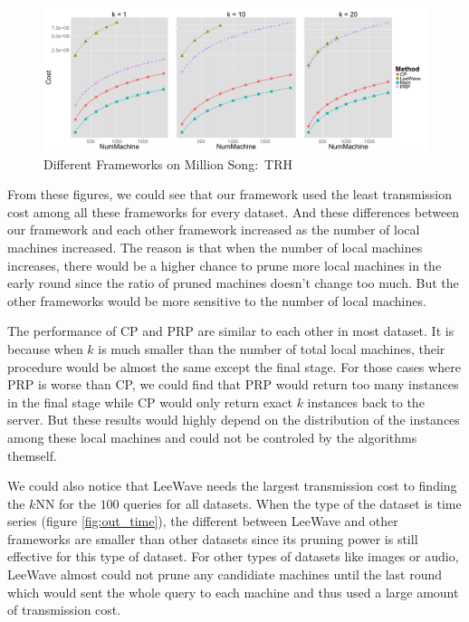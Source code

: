 \begin{figure}[htpb!]
  \centering
  \includegraphics[width=1.0\linewidth]{exp/out/trh.png}
  \caption{Different Frameworks on Million Song:~TRH}
  \label{fig:out_trh}
\end{figure}

From these figures, we could see that our framework used the least transmission cost among all these frameworks for every dataset.  And these differences between our framework and each other framework increased as the number of local machines increased.  The reason is that when the number of local machines increases, there would be a higher chance to prune more local machines in the early round since the ratio of pruned machines doesn't change too much.  But the other frameworks would be more sensitive to the number of local machines.


The performance of CP and PRP are similar to each other in most dataset.  It is because when $k$ is much smaller than the number of total local machines, their procedure would be almost the same except the final stage.  For those cases where PRP is worse than CP, we could find that PRP would return too many instances in the final stage while CP would only return exact $k$ instances back to the server.  But these results would highly depend on the distribution of the instances among these local machines and could not be controled by the algorithms themself.


We could also notice that LeeWave needs the largest transmission cost to finding the $k$NN for the $100$ queries for all datasets.  When the type of the dataset is time series (figure \ref{fig:out_time}), the different between LeeWave and other frameworks are smaller than other datasets since its pruning power is still effective for this type of dataset. For other types of datasets like images or audio, LeeWave almost could not prune any candidiate machines until the last round which would sent the whole query to each machine and thus used a large amount of transmission cost. 

